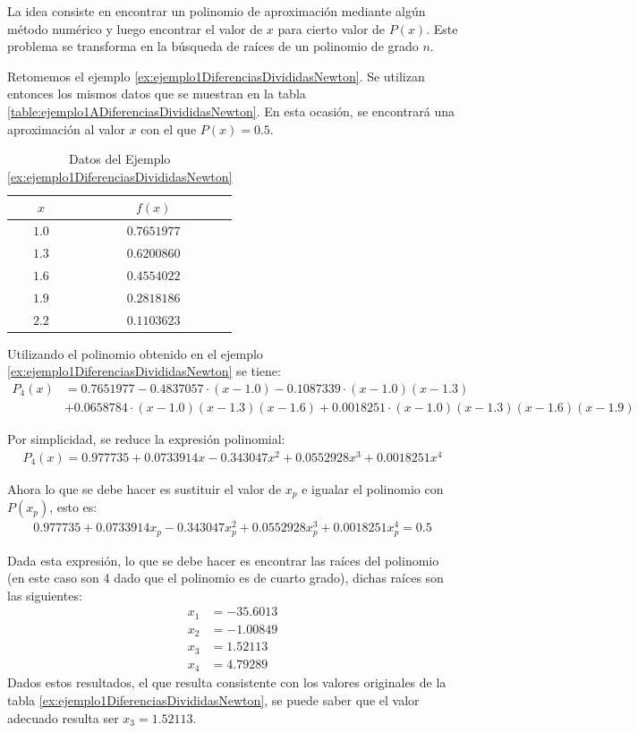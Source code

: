 La idea consiste en encontrar un polinomio de aproximación mediante algún método numérico y luego encontrar el valor de $x$ para cierto valor de $P(x)$. Este
problema se transforma en la búsqueda de raíces de un polinomio de grado $n$.

\begin{exerciseT}
Retomemos el ejemplo \ref{ex:ejemplo1DiferenciasDivididasNewton}. Se utilizan entonces los mismos datos que se muestran en la tabla
\ref{table:ejemplo1ADiferenciasDivididasNewton}. En esta ocasión, se encontrará una aproximación al valor $x$ con el que $P(x)=0.5$.
\begin{table}[H]
	\centering
	\begin{tabular}{cc}
		\toprule
		$x$ & $f(x)$\\ \midrule
		$1.0$ & $0.7651977$ \\
		$1.3$ & $0.6200860$ \\
		$1.6$ & $0.4554022$ \\
		$1.9$ & $0.2818186$ \\
		$2.2$ & $0.1103623$ \\
		\bottomrule
	\end{tabular}
    \caption{Datos del Ejemplo \ref{ex:ejemplo1DiferenciasDivididasNewton}}
\end{table}

Utilizando el polinomio obtenido en el ejemplo \ref{ex:ejemplo1DiferenciasDivididasNewton} se tiene:
\begin{align*}
	P_4(x) &= 0.7651977 - 0.4837057\cdot(x-1.0) - 0.1087339\cdot(x-1.0)(x-1.3)\\ 
	&+ 0.0658784\cdot(x-1.0)(x-1.3)(x-1.6) + 0.0018251\cdot(x-1.0)(x-1.3)(x-1.6)(x-1.9)
\end{align*}

Por simplicidad, se reduce la expresión polinomial:
\begin{align*}
	P_4(x)=0.977735 + 0.0733914 x - 0.343047 x^2 + 0.0552928 x^3 + 0.0018251 x^4
\end{align*}

Ahora lo que se debe hacer es sustituir el valor de $x_p$ e igualar el polinomio con $P(x_p)$, esto es:
\begin{align*}
	0.977735 + 0.0733914 x_p - 0.343047 x_p^2 + 0.0552928 x_p^3 + 0.0018251 x_p^4 = 0.5
\end{align*}

Dada esta expresión, lo que se debe hacer es encontrar las raíces del polinomio (en este caso son 4 dado que el polinomio 
es de cuarto grado), dichas raíces son las siguientes:
\begin{align*}
	x_1 &= -35.6013\\
	x_2 &= -1.00849\\
	x_3 &= 1.52113\\
	x_4 &= 4.79289
\end{align*}
Dados estos resultados, el que resulta consistente con los valores originales de la tabla \ref{ex:ejemplo1DiferenciasDivididasNewton}, 
se puede saber que el valor adecuado resulta ser $x_3 = 1.52113$.
\end{exerciseT}


